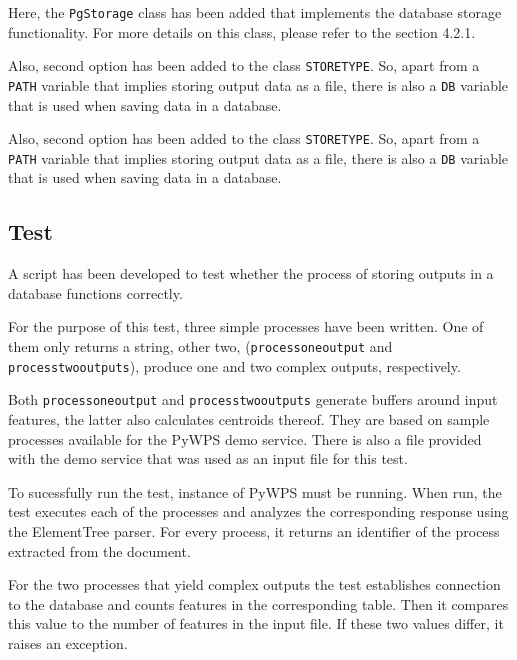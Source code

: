 Here, the \texttt{PgStorage} class has been added that implements the
database storage functionality. For more details on this class, please
refer to the section 4.2.1.

Also, second option has been added to the class
\texttt{STORE\textunderscore TYPE}.  So, apart from a \texttt{PATH}
variable that implies storing output data as a file, there is also a
\texttt{DB} variable that is used when saving data in a database.

Also, second option has been added to the class
\texttt{STORE\textunderscore TYPE}. So, apart from a \texttt{PATH}
variable that implies storing output data as a file, there is also a
\texttt{DB} variable that is used when saving data in a database.

\subsection{Test} 

A script has been developed to test whether the process of storing
outputs in a database functions correctly.

For the purpose of this test, three simple processes have been
written. One of them only returns a string, other two,
(\texttt{process\textunderscore one\textunderscore output} and
\texttt{process\textunderscore two\textunderscore outputs}), produce
one and two complex outputs, respectively.

Both \texttt{process\textunderscore one\textunderscore output} and
\texttt{process\textunderscore two\textunderscore outputs} generate
buffers around input features, the latter also calculates centroids
thereof. They are based on sample processes available for the PyWPS
demo service. There is also a  file provided with the demo
service that was used as an input file for this test.

To sucessfully run the test, instance of PyWPS must be running. When
run, the test executes each of the processes and analyzes the
corresponding  response using the ElementTree 
parser. For every process, it returns an identifier of the process
extracted from the  document.

For the two processes that yield complex outputs the test establishes
connection to the database and counts features in the corresponding
table. Then it compares this value to the number of features in the
input file. If these two values differ, it raises an exception.

